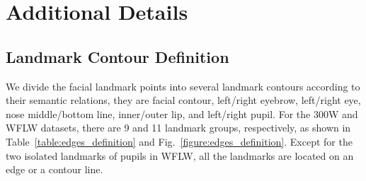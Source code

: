 \documentclass[letterpaper]{article} \usepackage{aaai23}  \usepackage{times}  \usepackage{helvet}  \usepackage{courier}  \usepackage[hyphens]{url}  \usepackage{graphicx} \urlstyle{rm} \def\UrlFont{\rm}  \usepackage{natbib}  \usepackage{caption} \frenchspacing  \setlength{\pdfpagewidth}{8.5in}  \setlength{\pdfpageheight}{11in}  \usepackage{algorithm}
\begin{document}
\begin{table}[htbp]
\centering
\small
{}
\caption{MAPE Comparison of different methods on 300W dataset. 4 facial morphometric measures are demonstrated in total.}
\label{table:metrics_comparison}
\end{table}



\section{Additional Details}

\subsection{Landmark Contour Definition}
We divide the facial landmark points into several landmark contours according to their semantic relations, they are facial contour, left/right eyebrow, left/right eye, nose middle/bottom line, inner/outer lip, and left/right pupil.
For the 300W and WFLW datasets, there are 9 and 11 landmark groups, respectively, as shown in Table~\ref{table:edges_definition} and Fig.~\ref{figure:edges_definition}.
Except for the two isolated landmarks of pupils in WFLW, all the landmarks are located on an edge or a contour line.
\end{document}
